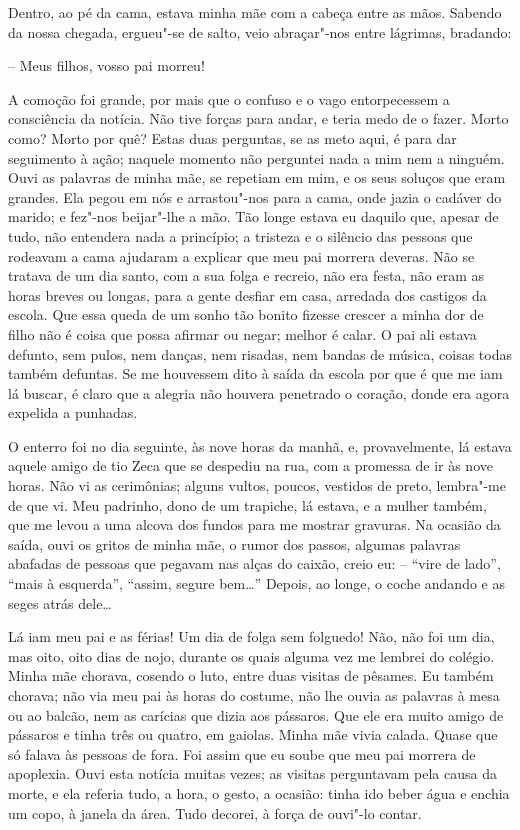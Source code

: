 Dentro, ao pé da cama, estava minha mãe com a cabeça entre as mãos.
Sabendo da nossa chegada, ergueu"-se de salto, veio abraçar"-nos entre
lágrimas, bradando:

-- Meus filhos, vosso pai morreu!

A comoção foi grande, por mais que o confuso e o vago entorpecessem a
consciência da notícia. Não tive forças para andar, e teria medo de o
fazer. Morto como? Morto por quê? Estas duas perguntas, se as meto aqui,
é para dar seguimento à ação; naquele momento não perguntei nada a mim
nem a ninguém. Ouvi as palavras de minha mãe, se repetiam em mim, e os
seus soluços que eram grandes. Ela pegou em nós e arrastou"-nos para a
cama, onde jazia o cadáver do marido; e fez"-nos beijar"-lhe a mão. Tão
longe estava eu daquilo que, apesar de tudo, não entendera nada a
princípio; a tristeza e o silêncio das pessoas que rodeavam a cama
ajudaram a explicar que meu pai morrera deveras. Não se tratava de um
dia santo, com a sua folga e recreio, não era festa, não eram as horas
breves ou longas, para a gente desfiar em casa, arredada dos castigos da
escola. Que essa queda de um sonho tão bonito fizesse crescer a minha
dor de filho não é coisa que possa afirmar ou negar; melhor é calar. O
pai ali estava defunto, sem pulos, nem danças, nem risadas, nem bandas
de música, coisas todas também defuntas. Se me houvessem dito à saída da
escola por que é que me iam lá buscar, é claro que a alegria não houvera
penetrado o coração, donde era agora expelida a punhadas.

O enterro foi no dia seguinte, às nove horas da manhã, e, provavelmente,
lá estava aquele amigo de tio Zeca que se despediu na rua, com a
promessa de ir às nove horas. Não vi as cerimônias; alguns vultos,
poucos, vestidos de preto, lembra"-me de que vi. Meu padrinho, dono de um
trapiche, lá estava, e a mulher também, que me levou a uma alcova dos
fundos para me mostrar gravuras. Na ocasião da saída, ouvi os gritos de
minha mãe, o rumor dos passos, algumas palavras abafadas de pessoas que
pegavam nas alças do caixão, creio eu: -- ``vire de lado'', ``mais à
esquerda'', ``assim, segure bem\ldots{}'' Depois, ao longe, o coche andando e
as seges atrás dele\ldots{}

Lá iam meu pai e as férias! Um dia de folga sem folguedo! Não, não foi
um dia, mas oito, oito dias de nojo, durante os quais alguma vez me
lembrei do colégio. Minha mãe chorava, cosendo o luto, entre duas
visitas de pêsames. Eu também chorava; não via meu pai às horas do
costume, não lhe ouvia as palavras à mesa ou ao balcão, nem as carícias
que dizia aos pássaros. Que ele era muito amigo de pássaros e tinha três
ou quatro, em gaiolas. Minha mãe vivia calada. Quase que só falava às
pessoas de fora. Foi assim que eu soube que meu pai morrera de
apoplexia. Ouvi esta notícia muitas vezes; as visitas perguntavam pela
causa da morte, e ela referia tudo, a hora, o gesto, a ocasião: tinha
ido beber água e enchia um copo, à janela da área. Tudo decorei, à força
de ouvi"-lo contar.


